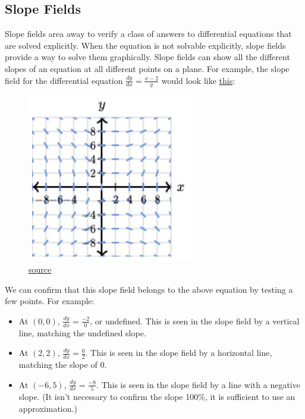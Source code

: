 \documentclass[12pt]{article}
\begin{document}
        \subsection{Slope Fields}
            Slope fields area away to verify a class of answers to differential equations that are solved explicitly. When the equation is not solvable explicitly, slope fields provide a way to solve them graphically. Slope fields can show all the different slopes of an equation at all different points on a plane. For example, the slope field for the differential equation $\frac{dy}{dx} = \frac{x-2}{y}$ would look like \hyperref[fig:slopefield1]{this}:

            \begin{figure}[H]
                \begin{center}
                    \includegraphics{fig13.JPG}
                    \caption{\href{https://www.khanacademy.org/math/ap-calculus-bc/bc-differential-equations-new}{source}}
                    \label{fig:slopefield1}
                \end{center}
            \end{figure}

            We can confirm that this slope field belongs to the above equation by testing a few points. For example:
            \begin{itemize}
                \item At $(0, 0)$, $\frac{dy}{dx} = \frac{-2}{0}$, or undefined. This is seen in the slope field by a vertical line, matching the undefined slope.
                \item At $(2, 2)$, $\frac{dy}{dx} = \frac{0}{2}$. This is seen in the slope field by a horizontal line, matching the slope of $0$.
                \item At $(-6, 5)$, $\frac{dy}{dx} = \frac{-8}{5}$. This is seen in the slope field by a line with a negative slope. (It isn't necessary to confirm the slope 100\%, it is sufficient to use an approximation.)
            \end{itemize}
\end{document}
